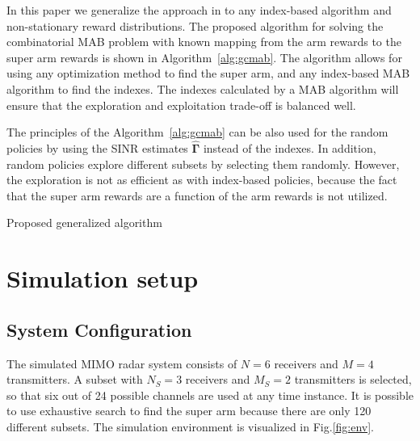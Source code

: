 \documentclass[conference]{IEEEtran}
\newcommand{\vsinrb}{\widehat{\boldsymbol{\Gamma}}}
\begin{document}
In this paper we generalize the approach in \cite{Mukherjee2012} to any index-based algorithm and non-stationary reward distributions. 
The proposed algorithm for solving the combinatorial MAB problem with known mapping from the arm rewards to the super arm rewards is shown in Algorithm~\ref{alg:gcmab}.
The algorithm allows for using any optimization method to find the super arm, and any index-based MAB algorithm to find the indexes.
The indexes calculated by a MAB algorithm will ensure that the exploration and exploitation trade-off is balanced well.

The principles of the Algorithm~\ref{alg:gcmab} can be also used for the random policies by using the SINR estimates $\vsinrb$ instead of the indexes.
In addition, random policies explore different subsets by selecting them randomly.
However, the exploration is not as efficient as with index-based policies, because the fact that the super arm rewards are a function of the arm rewards is not utilized.

\begin{algorithm}[h]
\SetAlgoLined
{}
\caption{Proposed generalized algorithm}
\label{alg:gcmab}
\end{algorithm}

\section{Simulation setup}
\label{sec:sim}


\subsection{System Configuration}
\label{seq:sys_conf}
The simulated MIMO radar system consists of $N=6$ receivers and $M=4$ transmitters.
A subset with $N_S=3$ receivers and $M_S=2$ transmitters is selected, so that six out of 24 possible channels are used at any time instance.
It is possible to use exhaustive search to find the super arm because there are only 120 different subsets.
The simulation environment is visualized in Fig.\ref{fig:env}.
\end{document}
